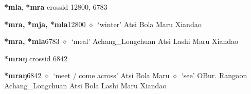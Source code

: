 \textbf{*mla}, \textbf{*mra}
  {\tiny crossid 12800, 6783}
  \begin{list}{}{\leftmargin=1.5em \itemindent=-1.5em}
  \item {\footnotesize \textbf{*mra, *mja, *mla}}{\tiny 12800}
         $\diamond$~`winter'
         Atsi 
\hspace{1ex}
         Bola 
\hspace{1ex}
         Maru 
\hspace{1ex}
         Xiandao 
  \item {\footnotesize \textbf{*mra, *mla}}{\tiny 6783}
\hspace{1ex}
         $\diamond$~`meal'
         Achang\_Longchuan 
\hspace{1ex}
         Atsi 
\hspace{1ex}
         Lashi 
\hspace{1ex}
         Maru 
\hspace{1ex}
         Xiandao 
  \end{list}
\item
\textbf{*mraŋ}
  {\tiny crossid 6842}
  \begin{list}{}{\leftmargin=1.5em \itemindent=-1.5em}
  \item {\footnotesize \textbf{*mraŋ}}{\tiny 6842}
         $\diamond$~`meet / come across'
         Atsi 
\hspace{1ex}
         Bola 
\hspace{1ex}
         Maru 
\hspace{1ex}
         $\diamond$~`see'
         OBur. 
\hspace{1ex}
         Rangoon 
\hspace{1ex}
         Achang\_Longchuan 
\hspace{1ex}
         Atsi 
\hspace{1ex}
         Bola 
\hspace{1ex}
         Lashi 
\hspace{1ex}
         Maru 
\hspace{1ex}
         Xiandao 
  \end{list}
